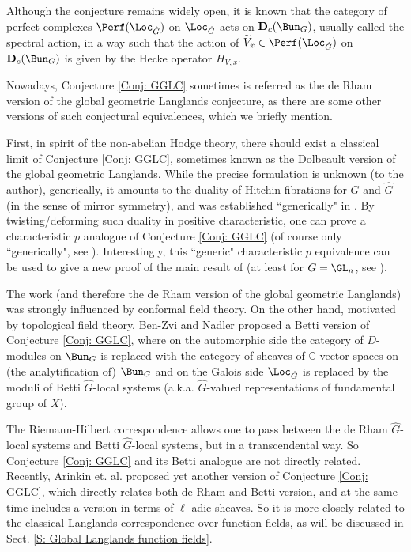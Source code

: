 \documentclass[11pt]{amsart}
\theoremstyle{definition}
\theoremstyle{definition}
\theoremstyle{definition}
\numberwithin{equation}{section}
\newcommand{\bC}{{\mathbb C}}
\begin{document}
Although the conjecture remains widely open, it is known that the category of perfect complexes $\Perf(\Loc_{\hat{G}})$ on $\Loc_{\hat{G}}$ acts on $\mathbf{D}_c(\Bun_G)$, usually called the spectral action, in a way such that the action of $\widetilde{V}_x\in \Perf(\Loc_{\hat{G}})$ on $\mathbf{D}_c(\Bun_G)$ is given by the Hecke operator $H_{V,x}$.

Nowadays, Conjecture \ref{Conj: GGLC} sometimes is referred as the de Rham version of the global geometric Langlands conjecture, as there are some other versions of such conjectural equivalences, which we briefly mention.

First, in spirit of the non-abelian Hodge theory, there should exist a classical limit of Conjecture \ref{Conj: GGLC}, sometimes known as the Dolbeault version of the global geometric Langlands. While the precise formulation is unknown (to the author), generically, it amounts to the duality of Hitchin fibrations for $G$ and $\hat{G}$ (in the sense of mirror symmetry), and was established ``generically" in \cite{Donagi-Pantev-Hitchin, Chen-Zhu-Geometric-Langlands-char-p}. By twisting/deforming such duality in positive characteristic, one can prove a characteristic $p$ analogue of Conjecture \ref{Conj: GGLC} (of course only  ``generically", see
\cite{Bezrukavnikov-Braverman-Geometric-Langlands-char-p, Chen-Zhu-Nonabelian-Hodge, Chen-Zhu-Geometric-Langlands-char-p}). Interestingly, this ``generic" characteristic $p$ equivalence can be used to give a new proof of the main result of  \cite{Beilinson-Drinfeld-Hitchin} (at least for $G=\GL_n$, see \cite{Bezrukavnikov-Travkin-Quantization}).

The work \cite{Beilinson-Drinfeld-Hitchin} (and therefore the de Rham version of the global geometric Langlands) was strongly influenced by conformal field theory. On the other hand,
motivated by topological field theory, Ben-Zvi and Nadler \cite{Ben-Zvi-Nadler-Betti-Geometric-Langlands} proposed a Betti version of Conjecture \ref{Conj: GGLC}, where on the automorphic side the category of $D$-modules on $\Bun_G$ is replaced with the category of sheaves of $\bC$-vector spaces on (the analytification of) $\Bun_G$ and on the Galois side $\Loc_{\hat{G}}$ is replaced by the moduli of Betti $\hat{G}$-local systems (a.k.a. $\hat{G}$-valued representations of fundamental group of $X$). 

The Riemann-Hilbert correspondence allows one to pass between the de Rham $\hat{G}$-local systems and Betti $\hat{G}$-local systems, but in a transcendental way. So Conjecture \ref{Conj: GGLC} and its Betti analogue are not directly related.
Recently, Arinkin et. al. \cite{AGKRRV} proposed yet another version of Conjecture \ref{Conj: GGLC}, which directly relates both de Rham and Betti version, and at the same time includes a version in terms of $\ell$-adic sheaves. So it is more closely related to the classical Langlands correspondence over function fields, as will be discussed in Sect. \ref{S: Global Langlands function fields}.
\end{document}
